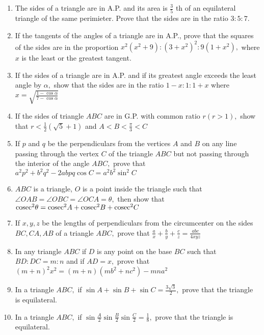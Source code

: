 \begin{enumerate}
\item The sides of a triangle are in A.P. and its area is $\frac{3}{5}$ th of an equilateral triangle of the same
     perimieter. Prove that the sides are in the ratio $3:5:7.$

\item If the tangents of the angles of a triangle are in A.P., prove that the squares of the sides are in the proportion
     $x^2(x^2 + 9): (3 + x^2)^2:9(1 + x^2),$ where $x$ is the least or the greatest tangent.

\item If the sides of a triangle are in A.P. and if its greatest angle exceeds the least angle by $\alpha,$ show that the
     sides are in the ratio $1 - x:1:1 + x$ where $x = \sqrt{\frac{1 - \cos\alpha}{7 - \cos\alpha}}$

\item If the sides of triangle $ABC$ are in G.P. with common ratio $r(r>1),$ show that $r<\frac{1}{2}(\sqrt{5} +
     1)$ and $A<B<\frac{\pi}{3}<C$

\item If $p$ and $q$ be the perpendiculars from the vertices $A$ and $B$ on any line passing through the
     vertex $C$ of the triangle $ABC$ but not passing through the interior of the angle $ABC,$ prove that
     $a^2p^2 + b^2q^2 - 2abpq\cos C = a^2b^2\sin^2C$

\item $ABC$ is a triangle, $O$ is a point inside the triangle such that $\angle OAB = \angle OBC = \angle OCA =
     \theta,$ then show that ${\rm cosec}^2\theta = {\rm cosec}^2A + {\rm cosec}^2B + {\rm cosec}^2C$

\item If $x, y, z$ be the lengths of perpendiculars from the circumcenter on the sides $BC, CA, AB$ of a triangle
     $ABC,$ prove that $\frac{a}{x} + \frac{b}{y} + \frac{c}{z} = \frac{abc}{4xyz}$

\item In any triangle $ABC$ if $D$ is any point on the base $BC$ such that $BD:DC = m:n$ and if
     $AD=x,$ prove that $(m + n)^2x^2 = (m + n)(mb^2 + nc^2) - mna^2$

\item In a triangle $ABC,$ if $\sin A + \sin B + \sin C = \frac{3\sqrt{3}}{2},$ prove that the triangle is equilateral.

\item In a triangle $ABC,$ if $\sin\frac{A}{2}\sin\frac{B}{2}\sin\frac{C}{2} = \frac{1}{8},$ prove that the triangle is
     equilateral.


\end{enumerate}
